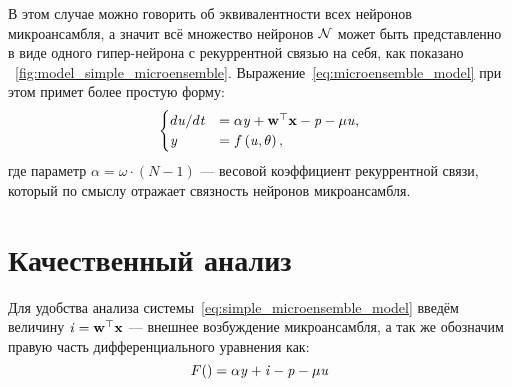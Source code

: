 В этом случае можно говорить об эквивалентности всех нейронов микроансамбля, а значит всё множество нейронов $\mathcal{N}$ может быть представленно в виде одного гипер-нейрона с рекуррентной связью на себя, как показано \onfigure~\ref{fig:model_simple_microensemble}. Выражение~\eqref{eq:microensemble_model} при этом примет более простую форму:
\begin{equation}
    \label{eq:simple_microensemble_model}
    \begin{cases}
    d\mathit{u}/d\mathit{t} &= \alpha \mathit{y} + \mathrm{\mathbf{w}}^{\top} \mathrm{\mathbf{x}} - \mathit{p} - \mu \mathit{u}, \\
    \mathit{y}              &= f\left( \mathit{u}, \theta \right), \\
    \end{cases}
\end{equation}
где параметр $\alpha = \omega \cdot \left( N - 1 \right)$ --- весовой коэффициент рекуррентной связи, который по смыслу отражает связность нейронов микроансамбля.



\section{Качественный анализ} \label{section:neuron_equilibrium}


Для удобства анализа системы~\eqref{eq:simple_microensemble_model} введём величину $\mathit{i} = \mathrm{\mathbf{w}}^{\top} \mathrm{\mathbf{x}}$ --- внешнее возбуждение микроансамбля, а так же обозначим правую часть дифференциального уравнения как:
\begin{equation}
    F() = \alpha \mathit{y} + \mathit{i} - \mathit{p} - \mu \mathit{u}
\end{equation}



\newpage
{}


